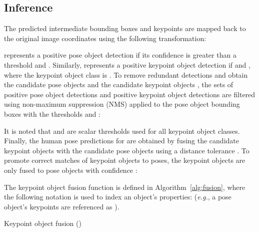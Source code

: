 \documentclass[runningheads]{llncs}
\newcommand{\eg}{\textit{e.g.}}
\newcommand\hlll[1]{\bgroup
  \hskip0pt\color{black}#1\egroup
}
\begin{document}
\subsection{Inference}
The predicted intermediate bounding boxes  and keypoints  are mapped back to the original image coordinates using the following transformation:

 represents a positive pose object detection  if its confidence  is greater than a threshold  and . Similarly,  represents a positive keypoint object detection  if  and , where the keypoint object class is . To remove redundant detections and obtain the candidate pose objects  and the candidate keypoint objects , the sets of positive pose object detections  and positive keypoint object detections  are filtered using non-maximum suppression (NMS) applied to the pose object bounding boxes with the  thresholds  and :

\hlll{It is noted that  and  are scalar thresholds used for all keypoint object classes.} Finally, the human pose predictions  for  are obtained by fusing the candidate keypoint objects with the candidate pose objects using a distance tolerance . To promote correct matches of keypoint objects to poses, the keypoint objects are only fused to pose objects with confidence :

The keypoint object fusion function  is defined in Algorithm~\ref{alg:fusion}, where the following notation is used to index an object's properties:  (\eg, a pose object's keypoints  are referenced as ).

\begin{algorithm}[t!]
\SetAlgoNoLine
\small
\DontPrintSemicolon
\newcommand\mycommfont[1]{\footnotesize\ttfamily\textcolor{blue}{#1}}

                              \KwInput{, , , }
\KwOutput{}

\caption{Keypoint object fusion ()}
\label{alg:fusion}
\end{algorithm}
\end{document}

